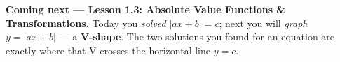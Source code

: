 \documentclass[12pt]{article}
\begin{document}
\vspace{0.10in}

\boxguard[10]
\begin{spiralbox}
\small
\textbf{Coming next --- Lesson 1.3: Absolute Value Functions \& Transformations.} Today you
\emph{solved} $|ax+b| = c$; next you will \emph{graph} $y = |ax+b|$ --- a \textbf{V-shape}. The two
solutions you found for an equation are exactly where that V crosses the horizontal line $y = c$.
\end{spiralbox}
\end{document}
